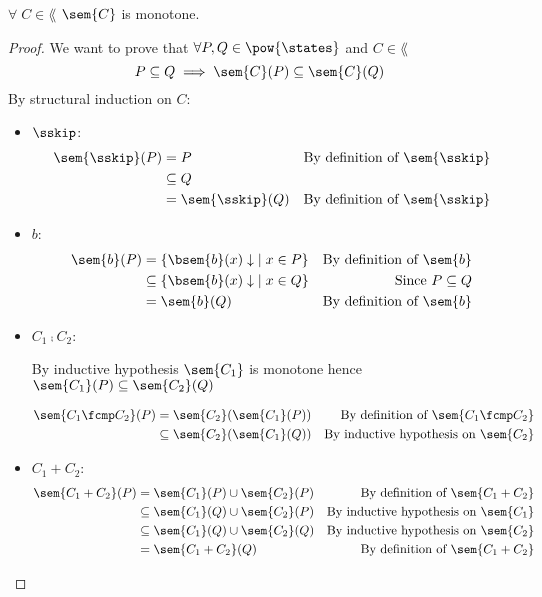 \begin{definition}
  \begin{theorem}[Monotonicity]
    \label{thm:sem-mono}
    $\forall \; C \in \lang$ $\sem{C}$ is monotone.
  \end{theorem}
  \begin{proof}
    We want to prove that $\forall P, Q \in \pow{\states}$ and $C \in \lang$
    $$P \subseteq Q \implies \sem{C}(P) \subseteq \sem{C}(Q)$$
    By structural induction on $C$:
    \begin{itemize}
      \item $\sskip$:
        \begin{align*}
          \sem{\sskip}(P) 
            &= P & \text{By definition of $\sem{\sskip}$}\\
            &\subseteq Q \\
            &= \sem{\sskip}(Q) & \text{By definition of $\sem{\sskip}$}\\
        \end{align*}

      \item $b$:
        \begin{align*}
          \sem{b}(P) 
            &= \{ \bsem{b}(x)\downarrow \; \mid x \in P \} 
            & \text{By definition of $\sem{b}$}\\
            &\subseteq \{ \bsem{b}(x)\downarrow \; \mid x \in Q \} 
            & \text{Since $P \subseteq Q$}\\
            &= \sem{b}(Q) & \text{By definition of $\sem{b}$}\\
        \end{align*}

      \item $C_1 \fcmp C_2$:

        By inductive hypothesis $\sem{C_1}$ is monotone hence
        $\sem{C_1}(P) \subseteq \sem{C_2}(Q)$

        \begin{align*}
          \sem{C_1 \fcmp C_2}(P) 
            &= \sem{C_2}(\sem{C_1}(P))
            &\text{By definition of $\sem{C_1 \fcmp C_2}$}\\
            &\subseteq \sem{C_2}(\sem{C_1}(Q))
            &\text{By inductive hypothesis on $\sem{C_2}$} \\
        \end{align*}
    
      \item $C_1 + C_2$:
        \begin{align*}
          \sem{C_1 + C_2}(P) 
            &= \sem{C_1}(P) \cup \sem{C_2}(P)
            &\text{By definition of $\sem{C_1 + C_2}$}\\
            &\subseteq \sem{C_1}(Q) \cup \sem{C_2}(P)
            &\text{By inductive hypothesis on $\sem{C_1}$} \\
            &\subseteq \sem{C_1}(Q) \cup \sem{C_2}(Q)
            &\text{By inductive hypothesis on $\sem{C_2}$} \\
            &= \sem{C_1 + C_2}(Q) 
            &\text{By definition of $\sem{C_1 + C_2}$}\\
        \end{align*}
      

\end{itemize}
\end{proof}
\end{definition}
